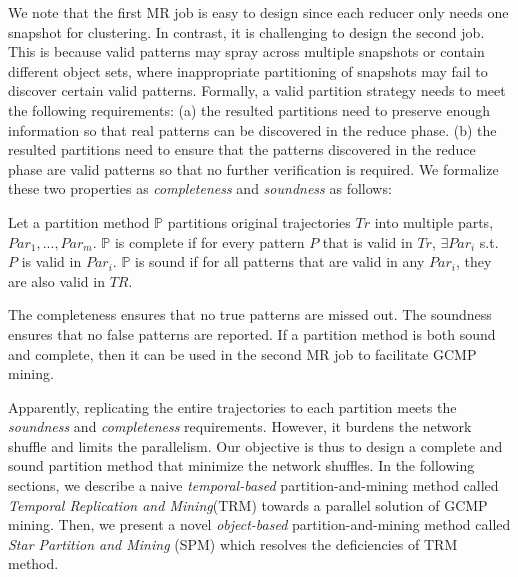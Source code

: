 We note that the first MR job is easy to design since each reducer only
needs one snapshot for clustering.
In contrast, it is challenging to design the second job. 
This is because valid patterns may spray across multiple snapshots 
or contain different object sets, where inappropriate partitioning
of snapshots may fail to discover certain valid patterns.
Formally, a valid partition strategy 
needs to meet the following requirements: (a) the resulted partitions need
to preserve enough information so that real patterns can be discovered in the reduce phase. 
(b) the resulted partitions need to ensure that
the patterns discovered in the reduce phase are valid patterns so that
no further verification is required. We formalize these two 
properties as \emph{completeness} and \emph{soundness} as follows:

\begin{definition}
Let a partition method $\mathbb{P}$ partitions original trajectories $Tr$ into multiple parts, $Par_1,...,Par_m$. $\mathbb{P}$ is complete if for every pattern $P$ that is valid in $Tr$, $\exists Par_i$ s.t. $P$ is valid in $Par_i$. $\mathbb{P}$ is sound if for all patterns that are valid in any $Par_i$, they are also valid in $TR$.
\end{definition}
The completeness ensures that no true patterns are missed out. 
The soundness ensures that no false patterns are reported. 
If a partition method is both sound and complete, then it can be used
in the second MR job to facilitate GCMP mining.

Apparently, replicating the entire trajectories to each 
partition meets the \emph{soundness} and \emph{completeness} requirements. 
However, it burdens the network shuffle and limits the parallelism. 
Our objective is thus to design a complete and sound partition method that minimize the network shuffles.
In the following sections, we describe a naive \emph{temporal-based} partition-and-mining method called \emph{Temporal Replication and Mining}(TRM) towards a parallel solution of GCMP mining. Then,
we present a novel \emph{object-based} partition-and-mining method
called \emph{Star Partition and Mining} (SPM) which resolves
the deficiencies of TRM method.
